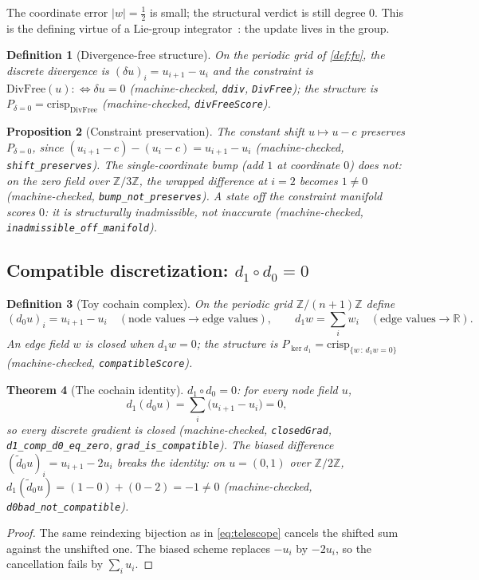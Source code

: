 \documentclass[11pt,a4paper]{article}
\newtheorem{theorem}{Theorem}[section]
\newtheorem{proposition}[theorem]{Proposition}
\newtheorem{definition}[theorem]{Definition}
\newcommand{\Real}{\mathbb{R}}
\begin{document}
The coordinate error $|w| = \tfrac{1}{2}$ is small; the structural
verdict is still degree $0$.
This is the defining virtue of a Lie-group
integrator~\cite{iserles2000}: the update lives in the group.

\begin{definition}[Divergence-free structure]
\label{def:divfree}
On the periodic grid of \cref{def:fv}, the discrete divergence is
$(\delta u)_i = u_{i+1} - u_i$ and the constraint is
$\mathrm{DivFree}(u) :\iff \delta u = 0$
(machine-checked, \texttt{ddiv}, \texttt{DivFree});
the structure is
$P_{\delta = 0} = \mathrm{crisp}_{\mathrm{DivFree}}$
(machine-checked, \texttt{divFreeScore}).
\end{definition}

\begin{proposition}[Constraint preservation]
\label{thm:divfree}
The constant shift $u \mapsto u - c$ preserves $P_{\delta = 0}$, since
$(u_{i+1} - c) - (u_i - c) = u_{i+1} - u_i$
(machine-checked, \texttt{shift\_preserves}).
The single-coordinate bump (add $1$ at coordinate $0$) does not: on the
zero field over $\mathbb{Z}/3\mathbb{Z}$, the wrapped difference at
$i = 2$ becomes $1 \neq 0$
(machine-checked, \texttt{bump\_not\_preserves}).
A state off the constraint manifold scores $0$: it is structurally
inadmissible, not inaccurate
(machine-checked, \texttt{inadmissible\_off\_manifold}).
\end{proposition}

\subsection{Compatible discretization: $d_1 \circ d_0 = 0$}

\begin{definition}[Toy cochain complex]
\label{def:cochain}
On the periodic grid $\mathbb{Z}/(n{+}1)\mathbb{Z}$ define
\[
  (d_0 u)_i = u_{i+1} - u_i
  \quad (\text{node values} \to \text{edge values}),
  \qquad
  d_1 w = \sum_i w_i
  \quad (\text{edge values} \to \Real).
\]
An edge field $w$ is \emph{closed} when $d_1 w = 0$; the structure is
$P_{\ker d_1} = \mathrm{crisp}_{\{w \,:\, d_1 w = 0\}}$
(machine-checked, \texttt{compatibleScore}).
\end{definition}

\begin{theorem}[The cochain identity]
\label{thm:dd}
$d_1 \circ d_0 = 0$: for every node field $u$,
\[
  d_1(d_0 u) = \sum_i \bigl(u_{i+1} - u_i\bigr) = 0,
\]
so every discrete gradient is closed
(machine-checked, \texttt{closedGrad},
\texttt{d1\_comp\_d0\_eq\_zero}, \texttt{grad\_is\_compatible}).
The biased difference $(\tilde d_0 u)_i = u_{i+1} - 2 u_i$ breaks the
identity: on $u = (0, 1)$ over $\mathbb{Z}/2\mathbb{Z}$,
$d_1(\tilde d_0 u) = (1 - 0) + (0 - 2) = -1 \neq 0$
(machine-checked, \texttt{d0bad\_not\_compatible}).
\end{theorem}
\begin{proof}
The same reindexing bijection as in \cref{eq:telescope} cancels the
shifted sum against the unshifted one.
The biased scheme replaces $-u_i$ by $-2 u_i$, so the cancellation
fails by $\sum_i u_i$.
\end{proof}
\end{document}
